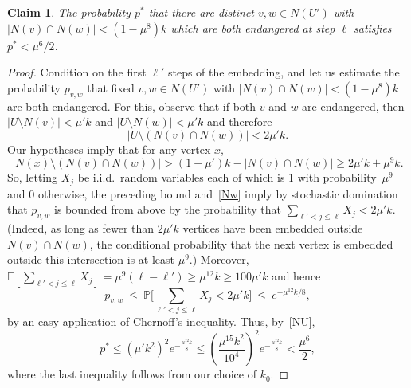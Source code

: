 \documentclass[12pt]{article}
\newtheorem{claim}[theorem]{Claim}
\begin{document}
\begin{claim}\label{aboutthepairs}
    The probability $p^*$ that there are distinct $v,w\in N(U')$ with $|N(v) \cap N(w)| < (1-\mu^8 )k$ which are both endangered at step $\ell$ satisfies
     $p^*<\mu^6/2$.
\end{claim}
      \begin{proof}
Condition on the first $\ell'$ steps of the embedding, and let us
estimate the probability $p_{v,w}$ that fixed $v,w\in N(U')$  with  $|N(v) \cap N(w)| < (1-\mu^8)k$ are  both   endangered.
For this, observe that if both $v$ and $w$ are  endangered, then  $|U\setminus N(v)  |< \mu' k$  and  $|U\setminus N(w)  |< \mu' k$ and therefore $$|U\setminus ( N(v) \cap N(w))|< 2\mu' k.$$ 
Our hypotheses imply that  for any vertex $x$,
$$|N(x)\setminus  ( N(v) \cap N(w))|>
(1-\mu')k-|N(v)\cap N(w)|
\ge 2\mu'k+ \mu^9k.$$
 So, letting $X_j$ be i.i.d.~random variables  each of which is 1 with probability~$\mu^9$    and 0 otherwise, 
 the preceding
bound and~\eqref{Nw} imply by stochastic domination that
$p_{v,w}$ is bounded from above by the probability that $
\sum_{\ell'<j\le\ell}X_j<2\mu'k$.
(Indeed, as long as fewer than $2\mu'k$ vertices have been
embedded outside $N(v)\cap N(w)$, the conditional probability
that the next vertex is embedded outside this intersection is at
least $\mu^9$.) Moreover,
$\mathbb E[\sum_{\ell'<j\le\ell}X_j]
=\mu^9(\ell-\ell')
\ge\mu^{12}k
\ge100\mu'k$
 and hence  $$p_{v,w}\ \le \ \mathbb P\big [\sum_{\ell'< j\le \ell} X_j< 2\mu' k   \big] \ \le \        e^{-\mu^{12}k/8},$$  
 by an easy application of Chernoff's inequality.    Thus, by~\eqref{NU},
\[
p^*
\le
(\mu'k^2)^2e^{-\frac{\mu^{12}k}{8}}
\le
(\frac{\mu^{15}k^2}{10^4})^2
e^{-\frac{\mu^{12}k}{8}}
<\frac{\mu^6}{2},
\]
where the last inequality follows from our choice of $k_0$.
      \end{proof}
\end{document}
